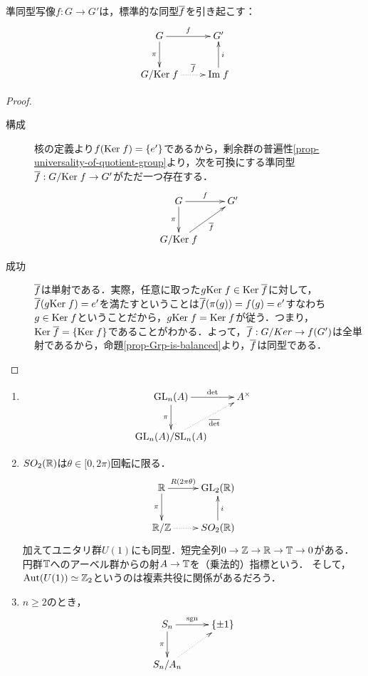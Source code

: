 \documentclass[uplatex,dvipdfmx]{jsreport}
\begin{document}
\begin{theorem}\label{thm-homomorphism}
    準同型写像$f:G\to G'$は，標準的な同型$\overline{f}$を引き起こす：
    \[\xymatrix{
        G\ar[r]^-f\ar[d]_-{\pi}&G'\\
        G/\Ker f\ar@{.>}[r]^-{\o{f}}&\Im f\ar[u]_-i
    }\]
\end{theorem}
\begin{proof}\mbox{}
    \begin{description}
        \item[構成] 核の定義より$f(\mathrm{Ker}\; f)=\{e'\}$であるから，剰余群の普遍性\ref{prop-universality-of-quotient-group}より，次を可換にする準同型$\overline{f}:G/\mathrm{Ker}\; f\to G'$がただ一つ存在する．\[\xymatrix{
            G\ar[r]^-f\ar[d]_-\pi&G'\\
            G/\Ker f\ar[ur]_-{\o{f}}
        }\]
        \item[成功] $\overline{f}$は単射である．実際，任意に取った$g\mathrm{Ker}\; f\in\mathrm{Ker}\;\overline{f}$に対して，$\overline{f}(g\mathrm{Ker}\; f)=e'$を満たすということは$\overline{f}(\pi(g))=f(g)=e'$すなわち$g\in\mathrm{Ker}\; f$ということだから，$g\mathrm{Ker}\; f=\mathrm{Ker}\; f$が従う．つまり，$\mathrm{Ker}\;\overline{f}=\{\mathrm{Ker}\; f\}$であることがわかる．よって，$\overline{f}:G/Ker\to f(G')$は全単射であるから，命題\ref{prop-Grp-is-balanced}より，$\overline{f}$は同型である．
    \end{description}
\end{proof}

\begin{example}\mbox{}\label{example-circle-group}
    \begin{enumerate}
        \item \[\xymatrix{
            \GL_n(A)\ar[r]^-{\det}\ar[d]_-{\pi}&A^\times\\
            \GL_n(A)/\SL_n(A)\ar@{.>}[ur]_-{\o{\det}}
        }\]
        \item $SO_2(\mathbb{R})$は$\theta\in[0,2\pi)$回転に限る．
        \[\xymatrix{
            \R\ar[r]^-{R(2\pi\theta)}\ar[d]_-{\pi}&\GL_2(\R)\\
            \R/\Z\ar@{.>}[r]&SO_2(\R)\ar[u]_-i
        }\]
        加えてユニタリ群$U(1)$にも同型．短完全列$0\to\mathbb{Z}\to\mathbb{R}\to\mathbb{T}\to 0$がある．
        円群$\mathbb{T}$へのアーベル群からの射$A\to\mathbb{T}$を（乗法的）指標という．
        そして，$\mathrm{Aut}(U(1))\simeq\mathbb{Z}_2$というのは複素共役に関係があるだろう．
        \item $n\ge 2$のとき，
        \[\xymatrix{
            S_n\ar[r]^-{\sgn}\ar[d]_-{\pi}&\{\pm 1\}\\
            S_n/A_n\ar@{.>}[ur]
        }\]
    \end{enumerate}
\end{example}
\end{document}
